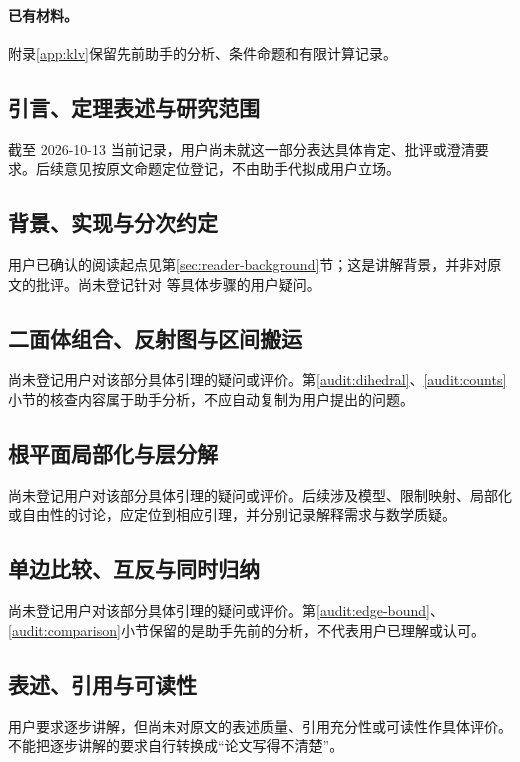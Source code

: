 \paragraph{已有材料。}附录\ref{app:klv}保留先前助手的分析、条件命题和有限计算记录。

\subsection{引言、定理表述与研究范围}
截至 2026-10-13 当前记录，用户尚未就这一部分表达具体肯定、批评或澄清要求。后续意见按原文命题定位登记，不由助手代拟成用户立场。

\subsection{背景、实现与分次约定}
用户已确认的阅读起点见第\ref{sec:reader-background}节；这是讲解背景，并非对原文的批评。尚未登记针对  等具体步骤的用户疑问。

\subsection{二面体组合、反射图与区间搬运}
尚未登记用户对该部分具体引理的疑问或评价。第\ref{audit:dihedral}、\ref{audit:counts}小节的核查内容属于助手分析，不应自动复制为用户提出的问题。

\subsection{根平面局部化与层分解}
尚未登记用户对该部分具体引理的疑问或评价。后续涉及模型、限制映射、局部化或自由性的讨论，应定位到相应引理，并分别记录解释需求与数学质疑。

\subsection{单边比较、互反与同时归纳}
尚未登记用户对该部分具体引理的疑问或评价。第\ref{audit:edge-bound}、\ref{audit:comparison}小节保留的是助手先前的分析，不代表用户已理解或认可。

\subsection{表述、引用与可读性}
用户要求逐步讲解，但尚未对原文的表述质量、引用充分性或可读性作具体评价。不能把逐步讲解的要求自行转换成“论文写得不清楚”。

